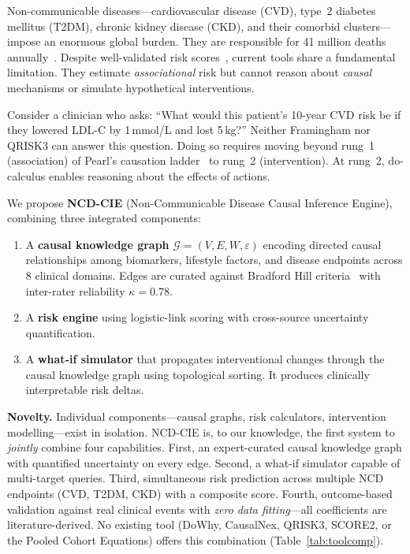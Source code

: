 \documentclass[runningheads]{llncs}
\begin{document}
Non-communicable diseases---cardiovascular disease (CVD), type~2
diabetes mellitus (T2DM), chronic kidney disease (CKD), and their
comorbid clusters---impose an enormous global burden.
They are responsible for 41 million deaths
annually~\cite{who2021ncd}.
Despite well-validated risk scores~\cite{dagostino2008,hippisley2017qrisk3,score22021},
current tools share a fundamental limitation.
They estimate \emph{associational} risk but cannot reason about
\emph{causal} mechanisms or simulate hypothetical interventions.

Consider a clinician who asks: ``What would this patient's 10-year
CVD risk be if they lowered LDL-C by 1\,mmol/L and lost 5\,kg?''
Neither Framingham nor QRISK3 can answer this question.
Doing so requires moving beyond rung~1 (association) of Pearl's
causation ladder~\cite{pearl2018book} to rung~2 (intervention).
At rung~2, do-calculus enables reasoning about the effects of actions.

We propose \textbf{NCD-CIE} (Non-Communicable Disease Causal Inference
Engine), combining three integrated components:
\begin{enumerate}
\item A \textbf{causal knowledge graph} $\mathcal{G}=(V,E,W,\varepsilon)$
  encoding directed causal relationships among biomarkers, lifestyle
  factors, and disease endpoints across 8 clinical domains.
  Edges are curated against Bradford Hill
  criteria~\cite{hill1965environment} with inter-rater reliability
  $\kappa=0.78$.
\item A \textbf{risk engine} using logistic-link scoring with
  cross-source uncertainty quantification.
\item A \textbf{what-if simulator} that propagates
  interventional changes through the causal knowledge graph using
  topological sorting.
  It produces clinically interpretable risk deltas.
\end{enumerate}

\noindent\textbf{Novelty.}
Individual components---causal graphs, risk calculators,
intervention modelling---exist in isolation.
NCD-CIE is, to our knowledge, the first system to \emph{jointly}
combine four capabilities.
First, an expert-curated causal knowledge graph with quantified
uncertainty on every edge.
Second, a what-if simulator capable of multi-target
queries.
Third, simultaneous risk prediction across multiple NCD endpoints
(CVD, T2DM, CKD) with a composite score.
Fourth, outcome-based validation against real clinical events with
\emph{zero data fitting}---all coefficients are literature-derived.
No existing tool (DoWhy, CausalNex, QRISK3, SCORE2, or the Pooled
Cohort Equations) offers this combination (Table~\ref{tab:toolcomp}).
\end{document}
